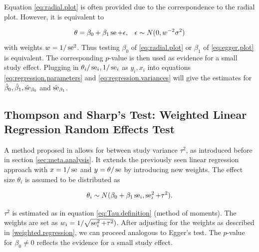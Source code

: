 \documentclass[11pt,a4paper,twoside]{book}\usepackage[]{graphicx}\usepackage[]{color}
\begin{document}
Equation \eqref{eq:radial.plot} is often provided due to the correspondence to the radial plot. However, it is equivalent to

\begin{align}
\theta &= \beta_0 + \beta_1 \operatorname{se} + \epsilon, & \epsilon \sim N(0, w^{-2}\sigma^2) \label{eq:egger.plot}
\end{align}
with weights $w = 1/\operatorname{se}^2$. Thus testing $\beta_0$ of \eqref{eq:radial.plot} or $\beta_1$ of \eqref{eq:egger.plot} is equivalent. The corresponding  $p$\hspace{0.4mm}-value is then used as evidence for a small study effect. Plugging in  $\theta_i/\operatorname{se}_i, 1/\operatorname{se}_i$ as $y_i, x_i$ into equations \eqref{eq:regression.parameters} and \eqref{eq:regression.variances} will give the estimates for $\hat{\beta}_0, \hat{\beta}_1,\hat{\operatorname{se}}_{\beta_0}$ and $\hat{\operatorname{se}}_{\beta_1}$.



\subsection{Thompson and Sharp's Test: Weighted Linear Regression Random Effects Test} \label{sec:Thompson}
A method proposed in \citet{thompson.sharp} allows for between study variance $\tau^2$, as introduced before in section \ref{sec:meta.analysis}. It extends the previously seen linear regression approach with $x = 1/\operatorname{se}$ and $y = \theta/\operatorname{se}$ by introducing new weights. The effect size $\theta_i$ is assumed to be distributed as

\begin{align}
\theta_i \sim N(\beta_0 + \beta_1 \operatorname{se}_i, \operatorname{se}_i^2 + \tau^2). \label{t.sharp.regression}
\end{align}

$\tau^2$ is estimated as in equation \eqref{eq:Tau.definition} (method of moments). %
The weights are set as $w_i = 1/\sqrt{\operatorname{se}_i^2 + \tau^2})$. After adjusting for the weights as described in \ref{weighted.regression}, we can proceed analogous to Egger's test. The  $p$\hspace{0.4mm}-value for $\beta_{0} \neq 0$ reflects the evidence for a small study effect.
\end{document}
